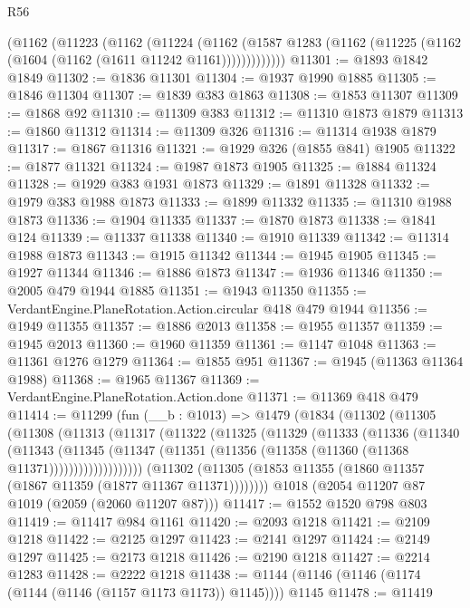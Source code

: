 \begin{lexlean}{R56}
\begin{coremodule}
      (@1162
        (@11223
          (@1162
            (@11224
              (@1162
                (@1587 @1283 (@1162 (@11225 (@1162 (@1604 (@1162 (@1611 @11242 @1161)))))))))))))
@11301 := @1893 @1842 @1849
@11302 := @1836 @11301
@11304 := @1937 @1990 @1885
@11305 := @1846 @11304
@11307 := @1839 @383 @1863
@11308 := @1853 @11307
@11309 := @1868 @92
@11310 := @11309 @383
@11312 := @11310 @1873 @1879
@11313 := @1860 @11312
@11314 := @11309 @326
@11316 := @11314 @1938 @1879
@11317 := @1867 @11316
@11321 := @1929 @326 (@1855 @841) @1905
@11322 := @1877 @11321
@11324 := @1987 @1873 @1905
@11325 := @1884 @11324
@11328 := @1929 @383 @1931 @1873
@11329 := @1891 @11328
@11332 := @1979 @383 @1988 @1873
@11333 := @1899 @11332
@11335 := @11310 @1988 @1873
@11336 := @1904 @11335
@11337 := @1870 @1873
@11338 := @1841 @124
@11339 := @11337 @11338
@11340 := @1910 @11339
@11342 := @11314 @1988 @1873
@11343 := @1915 @11342
@11344 := @1945 @1905
@11345 := @1927 @11344
@11346 := @1886 @1873
@11347 := @1936 @11346
@11350 := @2005 @479 @1944 @1885
@11351 := @1943 @11350
@11355 := VerdantEngine.PlaneRotation.Action.circular @418 @479 @1944
@11356 := @1949 @11355
@11357 := @1886 @2013
@11358 := @1955 @11357
@11359 := @1945 @2013
@11360 := @1960 @11359
@11361 := @1147 @1048
@11363 := @11361 @1276 @1279
@11364 := @1855 @951
@11367 := @1945 (@11363 @11364 @1988)
@11368 := @1965 @11367
@11369 := VerdantEngine.PlaneRotation.Action.done
@11371 := @11369 @418 @479
@11414 := @11299
    (fun (__b : @1013) =>
    @1479
      (@1834
        (@11302
          (@11305
            (@11308
              (@11313
                (@11317
                  (@11322
                    (@11325
                      (@11329
                        (@11333
                          (@11336
                            (@11340
                              (@11343
                                (@11345
                                  (@11347
                                    (@11351
                                      (@11356 (@11358 (@11360 (@11368 @11371)))))))))))))))))))
        (@11302 (@11305 (@1853 @11355 (@1860 @11357 (@1867 @11359 (@1877 @11367 @11371))))))))
    @1018
    (@2054 @11207 @87 @1019 (@2059 (@2060 @11207 @87)))
@11417 := @1552 @1520 @798 @803
@11419 := @11417 @984 @1161
@11420 := @2093 @1218
@11421 := @2109 @1218
@11422 := @2125 @1297
@11423 := @2141 @1297
@11424 := @2149 @1297
@11425 := @2173 @1218
@11426 := @2190 @1218
@11427 := @2214 @1283
@11428 := @2222 @1218
@11438 := @1144 (@1146 (@1146 (@1174 (@1144 (@1146 (@1157 @1173 @1173)) @1145)))) @1145
@11478 := @11419

\end{coremodule}
\end{lexlean}
